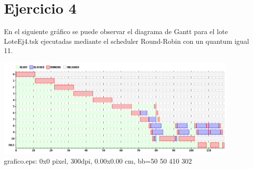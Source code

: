 \section{Ejercicio 4}



En el siguiente gráfico se puede observar el diagrama de Gantt para el lote LoteEj4.tsk ejecutadas mediante el scheduler Round-Robin con un quantum igual 11.

\begin {center}
\includegraphics[width=12cm]{../simusched/outputs/outEj4.png}
 grafico.eps: 0x0 pixel, 300dpi, 0.00x0.00 cm, bb=50 50 410 302
\end {center}

